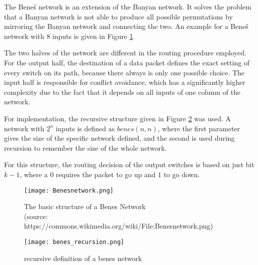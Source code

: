 The Beneš network is an extension of the Banyan network.
It solves the problem that a Banyan network is not able to produce all possible permutations by mirroring the Banyan network and connecting the two.
An example for a Beneš network with 8 inputs is given in Figure \ref{fig:benes}.

The two halves of the network are different in the routing procedure employed.
For the output half, the destination of a data packet defines the exact setting of every switch on its path, because there always is only one possible choice.
The input half is responsible for conflict avoidance, which has a significantly higher complexity due to the fact that it depends on all inputs of one column of the network.

For implementation, the recursive structure given in Figure \ref{fig:benes_recursion} was used.
A network with $2^n$ inputs is defined as $benes(n, n)$, where the first parameter gives the size of the specific network defined, and the second is used during recursion to remember the size of the whole network.

For this structure, the routing decision of the output switches is based on just bit $k - 1$, where a $0$ requires the packet to go up and $1$ to go down.

\begin{figure}[!ht]
	\centering
	\texttt{[image: Benesnetwork.png]}
	\caption{
		The basic structure of a Benes Network \protect \\ 
		(source: https://commons.wikimedia.org/wiki/File:Benesnetwork.png)
	}
	\label{fig:benes}
\end{figure}


\begin{figure}[!ht]
	\centering
	\texttt{[image: benes\_recursion.png]}
	\caption{recursive definition of a benes network}
	\label{fig:benes_recursion}
\end{figure}

